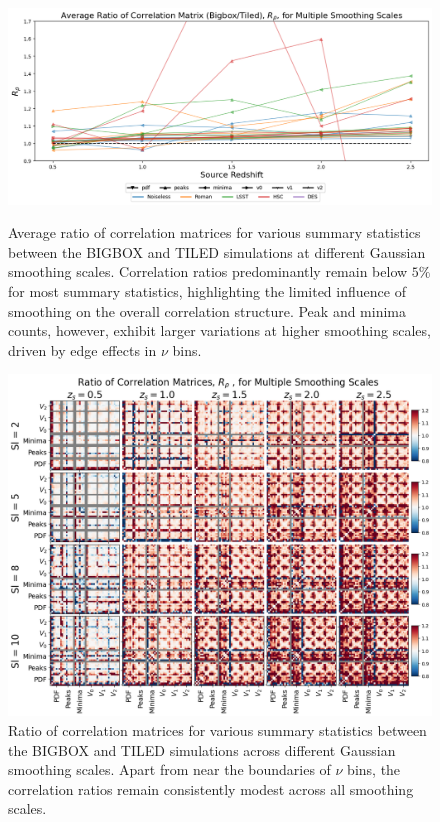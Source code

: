 \begin{figure}[p]
    \centering
    \includegraphics[width=\textwidth]{figures/results/avg_corr_ratio_sl.png}
    \caption[Average BIGBOX/TILED Ratio of Correlation for Multiple Smoothing Scales]
    {Average ratio of correlation matrices for various summary statistics between the BIGBOX and TILED simulations at different Gaussian smoothing scales. Correlation ratios predominantly remain below $5\%$ for most summary statistics, highlighting the limited influence of smoothing on the overall correlation structure. Peak and minima counts, however, exhibit larger variations at higher smoothing scales, driven by edge effects in $\nu$ bins.}
    \label{fig:avg_corr_sl}
    \includegraphics[width=\textwidth]{figures/results/corr_smoothing.png}
    \caption[BIGBOX/TILED Ratio of Correlation for Multiple Smoothing Scales]
    {Ratio of correlation matrices for various summary statistics between the BIGBOX and TILED simulations across different Gaussian smoothing scales. Apart from near the boundaries of $\nu$ bins, the correlation ratios remain consistently modest across all smoothing scales.} 
    \label{fig:corr_smoothing}
\end{figure}

